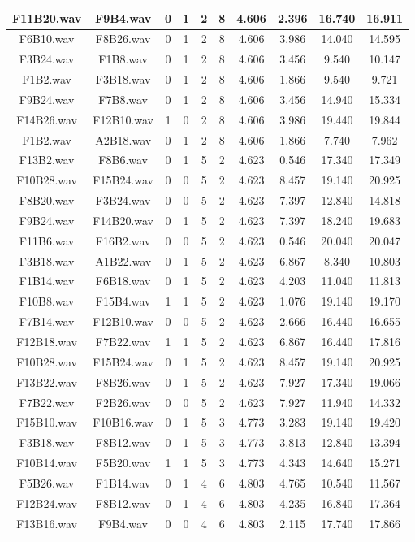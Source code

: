 \documentclass[11pt,a4paper]{book}
\begin{document}
\begin{longtable}[c]{|c|c|c|c|c|c|c|c|c|c|}
F11B20.wav&F9B4.wav&0&1&2&8&4.606&2.396&16.740&16.911\\ \hline
F6B10.wav&F8B26.wav&0&1&2&8&4.606&3.986&14.040&14.595\\ \hline
F3B24.wav&F1B8.wav&0&1&2&8&4.606&3.456&9.540&10.147\\ \hline
F1B2.wav&F3B18.wav&0&1&2&8&4.606&1.866&9.540&9.721\\ \hline
F9B24.wav&F7B8.wav&0&1&2&8&4.606&3.456&14.940&15.334\\ \hline
F14B26.wav&F12B10.wav&1&0&2&8&4.606&3.986&19.440&19.844\\ \hline
F1B2.wav&A2B18.wav&0&1&2&8&4.606&1.866&7.740&7.962\\ \hline
F13B2.wav&F8B6.wav&0&1&5&2&4.623&0.546&17.340&17.349\\ \hline
F10B28.wav&F15B24.wav&0&0&5&2&4.623&8.457&19.140&20.925\\ \hline
F8B20.wav&F3B24.wav&0&0&5&2&4.623&7.397&12.840&14.818\\ \hline
F9B24.wav&F14B20.wav&0&1&5&2&4.623&7.397&18.240&19.683\\ \hline
F11B6.wav&F16B2.wav&0&0&5&2&4.623&0.546&20.040&20.047\\ \hline
F3B18.wav&A1B22.wav&0&1&5&2&4.623&6.867&8.340&10.803\\ \hline
F1B14.wav&F6B18.wav&0&1&5&2&4.623&4.203&11.040&11.813\\ \hline
F10B8.wav&F15B4.wav&1&1&5&2&4.623&1.076&19.140&19.170\\ \hline
F7B14.wav&F12B10.wav&0&0&5&2&4.623&2.666&16.440&16.655\\ \hline
F12B18.wav&F7B22.wav&1&1&5&2&4.623&6.867&16.440&17.816\\ \hline
F10B28.wav&F15B24.wav&0&1&5&2&4.623&8.457&19.140&20.925\\ \hline
F13B22.wav&F8B26.wav&0&1&5&2&4.623&7.927&17.340&19.066\\ \hline
F7B22.wav&F2B26.wav&0&0&5&2&4.623&7.927&11.940&14.332\\ \hline
F15B10.wav&F10B16.wav&0&1&5&3&4.773&3.283&19.140&19.420\\ \hline
F3B18.wav&F8B12.wav&0&1&5&3&4.773&3.813&12.840&13.394\\ \hline
F10B14.wav&F5B20.wav&1&1&5&3&4.773&4.343&14.640&15.271\\ \hline
F5B26.wav&F1B14.wav&0&1&4&6&4.803&4.765&10.540&11.567\\ \hline
F12B24.wav&F8B12.wav&0&1&4&6&4.803&4.235&16.840&17.364\\ \hline
F13B16.wav&F9B4.wav&0&0&4&6&4.803&2.115&17.740&17.866\\ \hline

\end{longtable}
\end{document}
